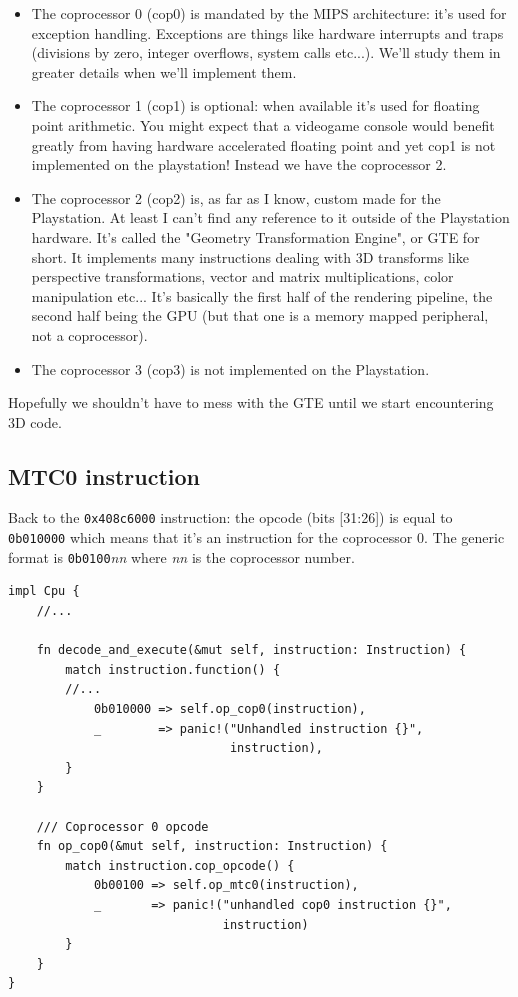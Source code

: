 \documentclass[a4paper]{article}
\newcommand{\code}[1] {\texttt{#1}}
\begin{document}
\begin{itemize}
\item The coprocessor 0 (cop0) is mandated by the MIPS architecture:
  it's used for exception handling. Exceptions are things like
  hardware interrupts and traps (divisions by zero, integer overflows,
  system calls etc...). We'll study them in greater details when we'll
  implement them.

\item The coprocessor 1 (cop1) is optional: when available it's used for
  floating point arithmetic. You might expect that a videogame console
  would benefit greatly from having hardware accelerated floating point
  and yet cop1 is not implemented on the playstation! Instead we have
  the coprocessor 2.

\item The coprocessor 2 (cop2) is, as far as I know, custom made for
  the Playstation. At least I can't find any reference to it outside
  of the Playstation hardware. It's called the "Geometry
  Transformation Engine", or GTE for short. It implements many
  instructions dealing with 3D transforms like perspective
  transformations, vector and matrix multiplications, color
  manipulation etc... It's basically the first half of the rendering
  pipeline, the second half being the GPU (but that one is a memory
  mapped peripheral, not a coprocessor).

\item The coprocessor 3 (cop3) is not implemented on the Playstation.
\end{itemize}

Hopefully we shouldn't have to mess with the GTE until we start
encountering 3D code.

\subsection{MTC0 instruction}

Back to the \code{0x408c6000} instruction: the opcode (bits [31:26])
is equal to \code{0b010000} which means that it's an instruction for
the coprocessor 0. The generic format is \code{0b0100}\emph{nn} where
\emph{nn} is the coprocessor number.

\begin{lstlisting}
impl Cpu {
    //...

    fn decode_and_execute(&mut self, instruction: Instruction) {
        match instruction.function() {
	    //...
            0b010000 => self.op_cop0(instruction),
            _        => panic!("Unhandled instruction {}",
                               instruction),
        }
    }

    /// Coprocessor 0 opcode
    fn op_cop0(&mut self, instruction: Instruction) {
        match instruction.cop_opcode() {
            0b00100 => self.op_mtc0(instruction),
            _       => panic!("unhandled cop0 instruction {}",
                              instruction)
        }
    }
}
\end{lstlisting}
\end{document}
